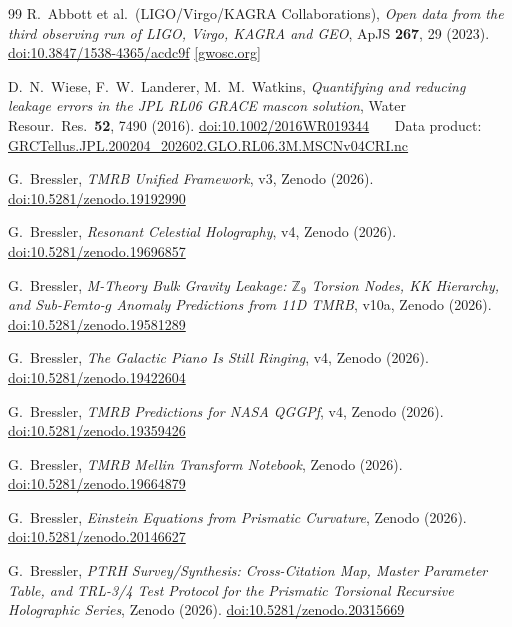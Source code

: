 \documentclass[11pt,a4paper]{article}
\begin{document}
\begin{thebibliography}{99}
  R.~Abbott et al.\ (LIGO/Virgo/KAGRA Collaborations),
  \textit{Open data from the third observing run of LIGO, Virgo, KAGRA and GEO},
  ApJS \textbf{267}, 29 (2023).
  \href{https://doi.org/10.3847/1538-4365/acdc9f}{doi:10.3847/1538-4365/acdc9f}
  \href{https://gwosc.org}{[gwosc.org]}

  D.~N.~Wiese, F.~W.~Landerer, M.~M.~Watkins,
  \textit{Quantifying and reducing leakage errors in the JPL RL06 GRACE mascon solution},
  Water Resour.\ Res.\ \textbf{52}, 7490 (2016).
  \href{https://doi.org/10.1002/2016WR019344}{doi:10.1002/2016WR019344}
  ~~~Data product:
  \href{https://podaac.jpl.nasa.gov/dataset/TELLUS_GRAC-GRFO_MASCON_CRI_GRID_RL06.3_V4}{GRCTellus.JPL.200204\_202602.GLO.RL06.3M.MSCNv04CRI.nc}

  G.~Bressler,
  \textit{TMRB Unified Framework}, v3,
  Zenodo (2026).
  \href{https://doi.org/10.5281/zenodo.19192990}{doi:10.5281/zenodo.19192990}

  G.~Bressler,
  \textit{Resonant Celestial Holography}, v4,
  Zenodo (2026).
  \href{https://doi.org/10.5281/zenodo.19696857}{doi:10.5281/zenodo.19696857}

  G.~Bressler,
  \textit{M-Theory Bulk Gravity Leakage: $\mathbb{Z}_9$ Torsion Nodes, KK Hierarchy,
    and Sub-Femto-$g$ Anomaly Predictions from 11D TMRB}, v10a,
  Zenodo (2026).
  \href{https://doi.org/10.5281/zenodo.19581289}{doi:10.5281/zenodo.19581289}

  G.~Bressler,
  \textit{The Galactic Piano Is Still Ringing}, v4,
  Zenodo (2026).
  \href{https://doi.org/10.5281/zenodo.19422604}{doi:10.5281/zenodo.19422604}

  G.~Bressler,
  \textit{TMRB Predictions for NASA QGGPf}, v4,
  Zenodo (2026).
  \href{https://doi.org/10.5281/zenodo.19359426}{doi:10.5281/zenodo.19359426}

  G.~Bressler,
  \textit{TMRB Mellin Transform Notebook},
  Zenodo (2026).
  \href{https://doi.org/10.5281/zenodo.19664879}{doi:10.5281/zenodo.19664879}

  G.~Bressler,
  \textit{Einstein Equations from Prismatic Curvature},
  Zenodo (2026).
  \href{https://doi.org/10.5281/zenodo.20146627}{doi:10.5281/zenodo.20146627}

  G.~Bressler,
  \textit{PTRH Survey/Synthesis: Cross-Citation Map, Master Parameter Table,
    and TRL-3/4 Test Protocol for the Prismatic Torsional Recursive Holographic
    Series},
  Zenodo (2026).
  \href{https://doi.org/10.5281/zenodo.20315669}{doi:10.5281/zenodo.20315669}

\end{thebibliography}
\end{document}

